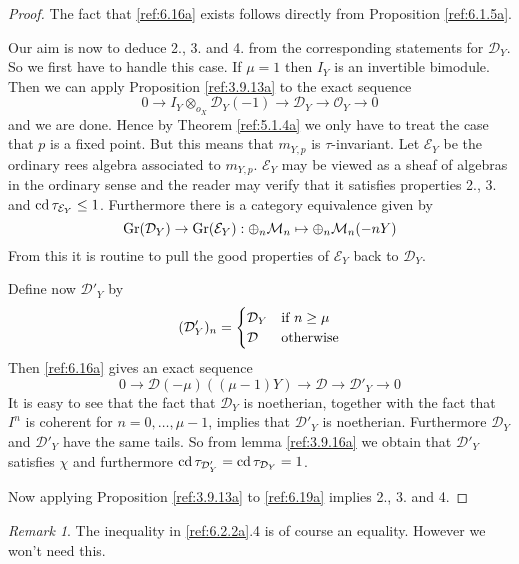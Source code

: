 \documentclass{amsproc}
\def\Dscr{{\mathcal D}}
\def\Escr{{\mathcal E}}
\def\Mscr{{\mathcal M}}
\def\Oscr{{\mathcal O}}
\def\cd{\mathop{\text{cd}}}
\def\Gr{\mathop{\text{Gr}}}
\def\r{\rightarrow}
\let\oldtext\text
\def\text#1{\oldtext{\upshape #1}}
\theoremstyle{definition}
\theoremstyle{remark}
\newtheorem{remarks}[lemmas]{Remark}
\numberwithin{equation}{section}
\numberwithin{table}{section}
\numberwithin{figure}{section}
\def\Gr{\mathop{\text{Gr}}}
\begin{document}
\begin{proof}
The fact that \eqref{ref:6.16a} exists follows directly from
Proposition \ref{ref:6.1.5a}.

Our aim is now to deduce 2., 3. and 4. from the corresponding statements
for $\Dscr_Y$. So we first have to handle this case. If $\mu=1$
then $I_Y$ is an invertible bimodule. Then we can apply Proposition
\ref{ref:3.9.13a} to the exact sequence
\[
0\r I_Y\otimes_{o_X} \Dscr_Y(-1) \r\Dscr_Y \r \Oscr_{Y}\r
0 \]
and we are done. Hence by Theorem \ref{ref:5.1.4a} we only have to treat
the case that $p$ is a fixed point. But this means that $m_{Y,p}$ is
$\tau$-invariant. 
Let $\Escr_Y$ be the ordinary rees algebra associated to $m_{Y,p}$.
$\Escr_Y$ may be viewed as a sheaf of algebras in the ordinary sense
and the reader may  verify that it satisfies properties 2., 3. and $\cd
\tau_{\Escr_Y}\le 1$.
 Furthermore there is a category equivalence
 given by
\begin{equation}
\label{ref:6.17a}
 \Gr(\Dscr_Y)\r \Gr(\Escr_Y):\oplus_n\Mscr_n\mapsto
 \oplus_n\Mscr_n(-nY)
\end{equation}
 From this it is routine to
 pull the good properties of $\Escr_Y$ back to $\Dscr_Y$.









Define now $\Dscr'_{Y}$ by
\begin{equation}
\label{ref:6.18a}
(\Dscr'_{Y})_n=
\begin{cases}
\Dscr_Y&\text{if $n\ge \mu$}\\
\Dscr&\text{otherwise}
\end{cases}
\end{equation}
Then \eqref{ref:6.16a} gives an exact sequence
\begin{equation}\label{ref:6.19a}
0\r \Dscr(-\mu)((\mu-1)Y)\r \Dscr\r
\Dscr'_{Y}\r 0 
\end{equation}
It is easy to see that the fact that $\Dscr_Y$ is noetherian,
together with the fact that ${I^n}$ is coherent for $n=0,\ldots,\mu-1$,
implies that $\Dscr'_{Y}$ is noetherian.  Furthermore $\Dscr_Y$ and
$\Dscr'_{Y}$ have the same tails. So from lemma \ref{ref:3.9.16a} we obtain
that
 $\Dscr'_{Y}$  satisfies $\chi$ and furthermore $\cd
 \tau_{\Dscr'_{Y}}=\cd \tau_{\Dscr_Y}=1$.


 Now
applying Proposition \ref{ref:3.9.13a} to \eqref{ref:6.19a} implies
2., 3. and 4.
\end{proof}
\begin{remarks}
The inequality in \ref{ref:6.2.2a}.4 is of course an equality. However
we won't need this.
\end{remarks}
\end{document}
